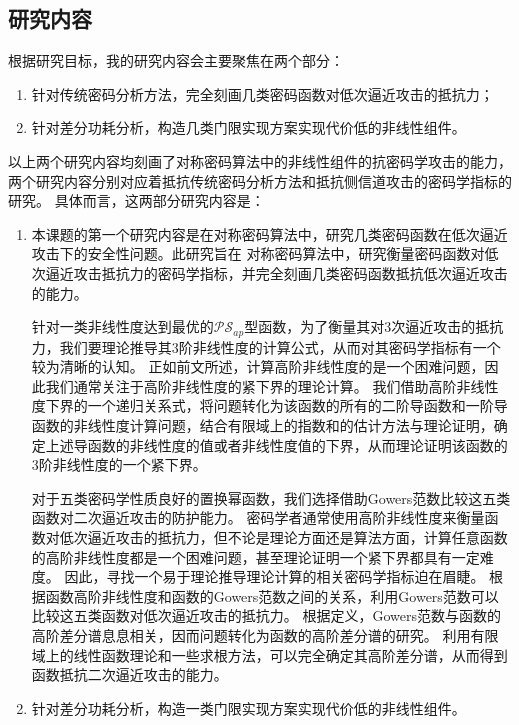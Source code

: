 \documentclass[a4paper,zihao=-4,AutoFakeBold]{ctexart}
\begin{document}
\subsection{研究内容}
根据研究目标，我的研究内容会主要聚焦在两个部分：
\begin{enumerate}[label=\arabic{*})]
    \item 针对传统密码分析方法，完全刻画几类密码函数对低次逼近攻击的抵抗力；
    \item 针对差分功耗分析，构造几类门限实现方案实现代价低的非线性组件。
\end{enumerate}
以上两个研究内容均刻画了对称密码算法中的非线性组件的抗密码学攻击的能力，两个研究内容分别对应着抵抗传统密码分析方法和抵抗侧信道攻击的密码学指标的研究。
具体而言，这两部分研究内容是：
\begin{enumerate}[label=(\arabic{*})]
    \item 本课题的第一个研究内容是在对称密码算法中，研究几类密码函数在低次逼近攻击下的安全性问题。此研究旨在
    对称密码算法中，研究衡量密码函数对低次逼近攻击抵抗力的密码学指标，并完全刻画几类密码函数抵抗低次逼近攻击的能力。
    
    针对一类非线性度达到最优的$\mathcal{PS}_{ap}$型函数，为了衡量其对3次逼近攻击的抵抗力，我们要理论推导其$3$阶非线性度的计算公式，从而对其密码学指标有一个较为清晰的认知。
    正如前文所述，计算高阶非线性度的是一个困难问题，因此我们通常关注于高阶非线性度的紧下界的理论计算。
    我们借助高阶非线性度下界的一个递归关系式，将问题转化为该函数的所有的二阶导函数和一阶导函数的非线性度计算问题，结合有限域上的指数和的估计方法与理论证明，确定上述导函数的非线性度的值或者非线性度值的下界，从而理论证明该函数的3阶非线性度的一个紧下界。

    对于五类密码学性质良好的置换幂函数，我们选择借助Gowers范数比较这五类函数对二次逼近攻击的防护能力。
    密码学者通常使用高阶非线性度来衡量函数对低次逼近攻击的抵抗力，但不论是理论方面还是算法方面，计算任意函数的高阶非线性度都是一个困难问题，甚至理论证明一个紧下界都具有一定难度。
    因此，寻找一个易于理论推导理论计算的相关密码学指标迫在眉睫。
    根据函数高阶非线性度和函数的Gowers范数之间的关系，利用Gowers范数可以比较这五类函数对低次逼近攻击的抵抗力。
    根据定义，Gowers范数与函数的高阶差分谱息息相关，因而问题转化为函数的高阶差分谱的研究。
    利用有限域上的线性函数理论和一些求根方法，可以完全确定其高阶差分谱，从而得到函数抵抗二次逼近攻击的能力。
    \item 针对差分功耗分析，构造一类门限实现方案实现代价低的非线性组件。
\end{enumerate}
\end{document}

